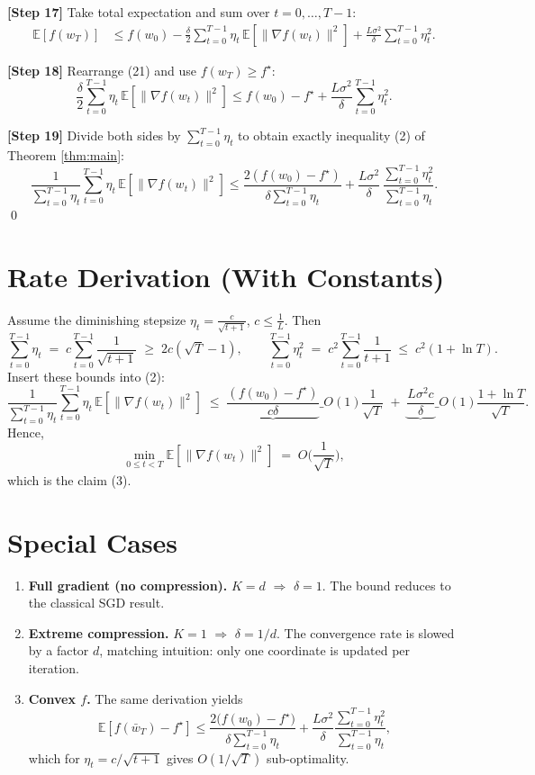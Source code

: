 \documentclass{article}
\begin{document}
\noindent\textbf{[Step 17]} Take total expectation and sum over $t=0,\dots,T-1$:
\[
\begin{aligned}
\mathbb{E}[f(w_T)]
&\le f(w_0)
-\frac{\delta}{2}\sum_{t=0}^{T-1}\eta_t\,
\mathbb{E}[\|\nabla f(w_t)\|^{2}]
+\frac{L\sigma^{2}}{\delta}\sum_{t=0}^{T-1}\eta_t^{2}.
\end{aligned}
\tag{21}
\]

\noindent\textbf{[Step 18]} Rearrange (21) and use $f(w_T)\ge f^\star$:
\[
\frac{\delta}{2}\sum_{t=0}^{T-1}\eta_t\,
\mathbb{E}[\|\nabla f(w_t)\|^{2}]
\le f(w_0)-f^\star
+\frac{L\sigma^{2}}{\delta}\sum_{t=0}^{T-1}\eta_t^{2}.
\tag{22}
\]

\noindent\textbf{[Step 19]} Divide both sides by $\sum_{t=0}^{T-1}\eta_t$ to obtain exactly inequality (2) of Theorem \ref{thm:main}:
\[
\frac{1}{\sum_{t=0}^{T-1}\eta_t}\sum_{t=0}^{T-1}\eta_t\,
\mathbb{E}[\|\nabla f(w_t)\|^{2}]
\le
\frac{2(f(w_0)-f^\star)}{\delta\sum_{t=0}^{T-1}\eta_t}
+
\frac{L\sigma^{2}}{\delta}\,
\frac{\sum_{t=0}^{T-1}\eta_t^{2}}{\sum_{t=0}^{T-1}\eta_t}.
\]
\qed

\section*{Rate Derivation (With Constants)}
Assume the diminishing stepsize $\eta_t=\frac{c}{\sqrt{t+1}}$, $c\le\frac{1}{L}$. Then
\[
\sum_{t=0}^{T-1}\eta_t
\;=\;
c\sum_{t=0}^{T-1}\frac{1}{\sqrt{t+1}}
\;\ge\;
2c(\sqrt{T}-1),
\qquad
\sum_{t=0}^{T-1}\eta_t^{2}
\;=\;
c^{2}\sum_{t=0}^{T-1}\frac{1}{t+1}
\;\le\;
c^{2}(1+\ln T).
\]
Insert these bounds into (2):
\[
\frac{1}{\sum_{t=0}^{T-1}\eta_t}\sum_{t=0}^{T-1}\eta_t\,
\mathbb{E}[\|\nabla f(w_t)\|^{2}]
\;\le\;
\underbrace{\frac{(f(w_0)-f^\star)}{c\delta}}\_{\displaystyle O(1)}
\frac{1}{\sqrt{T}}
\;+\;
\underbrace{\frac{L\sigma^{2}c}{\delta}}\_{\displaystyle O(1)}
\frac{1+\ln T}{\sqrt{T}}.
\]
Hence,
\[
\min_{0\le t<T}\mathbb{E}[\|\nabla f(w_t)\|^{2}]
\;=\;
O\!\Big(\frac{1}{\sqrt{T}}\Big),
\]
which is the claim (3).

\section*{Special Cases}
\begin{enumerate}
\item \textbf{Full gradient (no compression).} $K=d$ $\Rightarrow$ $\delta=1$. The bound reduces to the classical SGD result.
\item \textbf{Extreme compression.} $K=1$ $\Rightarrow$ $\delta=1/d$. The convergence rate is slowed by a factor $d$, matching intuition: only one coordinate is updated per iteration.
\item \textbf{Convex $f$.} The same derivation yields
\[
\mathbb{E}[f(\bar w_T)-f^\star]\le
\frac{2\big(f(w_0)-f^\star\big)}{\delta\sum_{t=0}^{T-1}\eta_t}
+\frac{L\sigma^{2}}{\delta}\frac{\sum_{t=0}^{T-1}\eta_t^{2}}{\sum_{t=0}^{T-1}\eta_t},
\]
which for $\eta_t=c/\sqrt{t+1}$ gives $O(1/\sqrt{T})$ sub‑optimality.
\end{enumerate}
\end{document}
